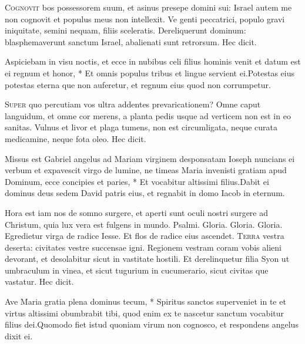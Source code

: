 \begin{multicols*}{2}
\lettrine[lines=2]{\zallmancaps \color{Red} C}{ognovit} bos possessorem suum, et asinus presepe domini sui: Israel autem me non cognovit et populus meus non intellexit. Ve genti peccatrici, populo gravi iniquitate, semini nequam, filiis sceleratis. Dereliquerunt dominum: blasphemaverunt sanctum Israel, abalienati sunt retrorsum. Hec dicit.
\begin{responsory}[aspiciebam]
{Aspiciebam in visu noctis, et ecce in nubibus celi filius hominis venit et datum est ei regnum et honor, * Et omnis populus tribus et lingue servient ei.}{Potestas eius potestas eterna que non auferetur, et regnum eius quod non corrumpetur.}
\end{responsory}
\lettrine[lines=2]{\zallmancaps \color{Blue} S}{uper} quo percutiam vos ultra addentes prevaricationem? Omne caput languidum, et omne cor merens, a planta pedis usque ad verticem non est in eo sanitas. Vulnus et livor et plaga tumens, non est circumligata, neque curata medicamine, neque fota oleo. Hec dicit.
\begin{responsory-doxology}
{Missus est Gabriel angelus ad Mariam virginem desponsatam Ioseph nuncians ei verbum et expavescit virgo de lumine, ne timeas Maria invenisti gratiam apud Dominum, ecce concipies et paries, * Et vocabitur altissimi filius.}{Dabit ei dominus deus sedem David patris eius, et regnabit in domo Iacob in eternum.}
\end{responsory-doxology}
 Hora est iam nos de somno surgere, et aperti sunt oculi nostri surgere ad Christum, quia lux vera est fulgens in mundo. {\color{Red} Psalmi.}
 Gloria.
 Gloria.
 Gloria. \V Egredietur virga de radice Iesse. \R Et flos de radice eius ascendet.
\lettrine[lines=2]{\zallmancaps \color{Red} T}{erra} vestra deserta: civitates vestre succensae igni. Regionem vestram coram vobis alieni
devorant, et desolabitur sicut in vastitate hostili. Et derelinquetur filia Syon ut umbraculum in vinea, et sicut tugurium in cucumerario, sicut civitas que vastatur. Hec dicit.
\begin{responsory}
{Ave Maria gratia plena dominus tecum, * Spiritus sanctos superveniet in te et virtus altissimi obumbrabit tibi, quod enim ex te nascetur sanctum vocabitur filius dei.}{Quomodo fiet istud quoniam virum non cognosco, et respondens angelus dixit ei.}

\end{responsory}
\end{multicols*}
